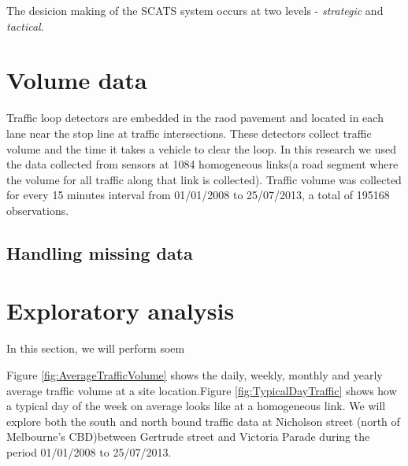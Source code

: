 The desicion making of the SCATS system occurs at two levels - \emph{strategic} and \emph{tactical}.


\section{Volume data}
Traffic loop detectors are embedded in the raod pavement and located in each lane near the stop
line at traffic intersections. These detectors collect traffic volume and the time it takes a
vehicle to clear the loop. In this research we used the data collected from sensors at 1084
homogeneous links(a road segment where the volume for all traffic along that link is collected).
Traffic volume was collected for every 15 minutes interval from 01/01/2008 to 25/07/2013, a total
of 195168 observations.


\subsection{Handling missing data}


\section{Exploratory analysis}
In this section, we will perform soem

Figure \ref{fig:AverageTrafficVolume} shows the daily, weekly, monthly and yearly average traffic
volume at a site location.Figure \ref{fig:TypicalDayTraffic} shows how a typical day of the week
on average looks like at a homogeneous link. We will explore both the south and north bound
traffic data at Nicholson street (north of Melbourne's CBD)between Gertrude street and
Victoria Parade  during the period 01/01/2008 to 25/07/2013.

